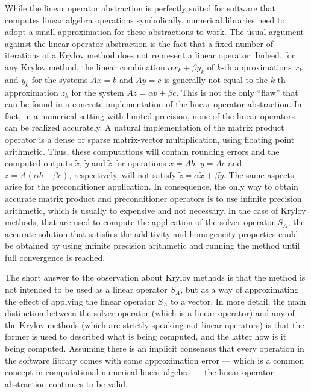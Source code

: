 While the linear operator abstraction is perfectly suited for software that
computes linear algebra operations symbolically, numerical libraries need to
adopt a small approximation for these abstractions to work. The usual
argument against the linear operator abstraction is the fact that a fixed number
of iterations of a Krylov method does not represent a linear operator. Indeed,
for any Krylov method, the linear combination $\alpha x_k + \beta y_k$ of $k$-th
approximations $x_k$ and $y_k$ for the systems $Ax = b$ and $Ay = c$ is
generally not equal to the $k$-th approximation $z_k$ for the system $Az =
\alpha b + \beta c$. This is not the only ``flaw'' that can be found in a
concrete implementation of the linear operator abstraction.  In fact, in a
numerical setting with limited precision, none of the linear operators can be
realized accurately.
A natural implementation of the matrix product operator is
a dense or sparse matrix-vector
multiplication, using floating point arithmetic. Thus, these computations will
contain rounding errors and the computed outputs $\widetilde{x}$,
$\widetilde{y}$ and $\widetilde{z}$ for operations $x = Ab$, $y = Ac$ and $z =
A(\alpha b + \beta c)$, respectively, will not satisfy $\widetilde{z} = \alpha
\widetilde{x} + \beta \widetilde{y}$.  The same aspects arise for the
preconditioner application. In consequence, the only way to obtain accurate
matrix product and preconditioner operators is to use infinite precision
arithmetic, which is usually to expensive and not necessary. In the case of
Krylov methods, that are used to compute the application of the solver operator
$S_A$, the accurate solution that satisfies the additivity and homogeneity
properties could be obtained by using infinite precision arithmetic and running
the method until full convergence is reached.

The short answer to the observation about Krylov methods is that the method is
not intended to be used as a linear operator $S_A$, but as a way of
approximating the effect of applying the linear operator $S_A$ to a vector.
In more detail, the main distinction between the solver operator (which is a
linear operator) and any of the Krylov methods (which are strictly speaking not
linear operators) is that the former is used to described what is being
computed, and the latter how is it being computed.
Assuming there is an implicit consensus that every operation in the software
library comes with some approximation error --- which is a common concept in
computational numerical linear algebra --- the linear operator abstraction
continues to be valid.

